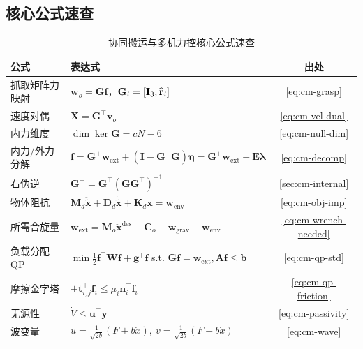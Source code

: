 \subsection*{核心公式速查}
\begin{table}[H]\centering\small
\caption{协同搬运与多机力控核心公式速查}
\label{tab:cm-formulas}
\begin{tabular}{p{4.0cm}p{7.4cm}c}
\toprule
公式 & 表达式 & 出处 \\
\midrule
抓取矩阵力映射 & $\mathbf{w}_o=\mathbf{G}\mathbf{f}$，$\mathbf{G}_i=[\mathbf{I}_3;\widehat{\mathbf{r}}_i]$ & \cref{eq:cm-grasp} \\
速度对偶 & $\dot{\mathbf{X}}=\mathbf{G}^\top\mathbf{v}_o$ & \cref{eq:cm-vel-dual} \\
内力维度 & $\dim\ker\mathbf{G}=cN-6$ & \cref{eq:cm-null-dim} \\
内力/外力分解 & $\mathbf{f}=\mathbf{G}^{+}\mathbf{w}_{\text{ext}}+(\mathbf{I}-\mathbf{G}^{+}\mathbf{G})\boldsymbol{\eta}=\mathbf{G}^{+}\mathbf{w}_{\text{ext}}+\mathbf{E}\boldsymbol{\lambda}$ & \cref{eq:cm-decomp} \\
右伪逆 & $\mathbf{G}^{+}=\mathbf{G}^\top(\mathbf{G}\mathbf{G}^\top)^{-1}$ & \cref{sec:cm-internal} \\
物体阻抗 & $\mathbf{M}_d\ddot{\tilde{\mathbf{x}}}+\mathbf{D}_d\dot{\tilde{\mathbf{x}}}+\mathbf{K}_d\tilde{\mathbf{x}}=\mathbf{w}_{\text{env}}$ & \cref{eq:cm-obj-imp} \\
所需合旋量 & $\mathbf{w}_{\text{ext}}=\mathbf{M}_o\ddot{\mathbf{x}}^{\text{des}}+\mathbf{C}_o-\mathbf{w}_{\text{grav}}-\mathbf{w}_{\text{env}}$ & \cref{eq:cm-wrench-needed} \\
负载分配 QP & $\min\tfrac12\mathbf{f}^\top\mathbf{W}\mathbf{f}+\mathbf{g}^\top\mathbf{f}$ s.t. $\mathbf{G}\mathbf{f}=\mathbf{w}_{\text{ext}},\mathbf{A}\mathbf{f}\le\mathbf{b}$ & \cref{eq:cm-qp-std} \\
摩擦金字塔 & $\pm\mathbf{t}_{i,j}^\top\mathbf{f}_i\le\mu_i\mathbf{n}_i^\top\mathbf{f}_i$ & \cref{eq:cm-qp-friction} \\
无源性 & $\dot V\le\mathbf{u}^\top\mathbf{y}$ & \cref{eq:cm-passivity} \\
波变量 & $u=\tfrac{1}{\sqrt{2b}}(F+b\dot x),\ v=\tfrac{1}{\sqrt{2b}}(F-b\dot x)$ & \cref{eq:cm-wave} \\
\bottomrule
\end{tabular}
\end{table}

